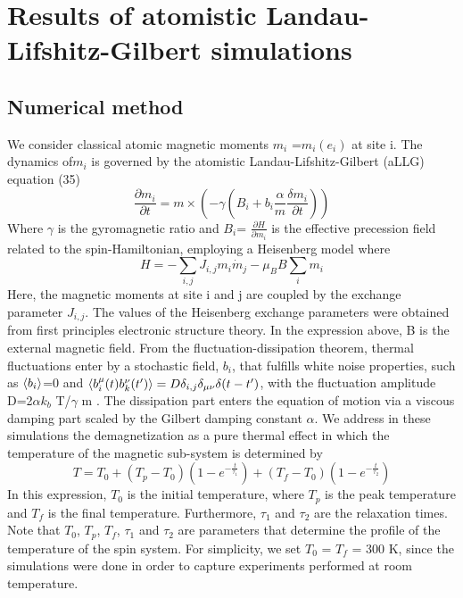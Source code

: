 \section{Results of atomistic Landau-Lifshitz-Gilbert simulations}

\subsection{Numerical method}
We consider classical atomic magnetic moments {$m_i$ }=$m_i(e_i)$ at site i. The dynamics of{$m_i$ }  is governed by the atomistic Landau-Lifshitz-Gilbert (aLLG) equation (35)
\begin{equation}
\frac{\partial m_i}{\partial t} = m \times (-\gamma(B_i+b_i\frac{\alpha}{m}\frac{\delta m_i}{\partial t}))
\end{equation}
Where $\gamma$ is the gyromagnetic ratio and $B_i$=  $\frac{\partial H}{\partial m_i}$ is the effective precession field related to the spin-Hamiltonian, employing a Heisenberg model where
\begin{equation}
H = - \sum_{i,j}J_{i,j}m_i \dot m_j - \mu_B B \sum_i m_i
\end{equation}
Here, the magnetic moments at site i and j are coupled by the exchange parameter $J_{i,j}$. The values of the Heisenberg exchange parameters were obtained from first principles electronic structure theory. In the expression above, B is the external magnetic field. From the fluctuation-dissipation theorem, thermal fluctuations enter by a stochastic field, $b_i$, that fulfills white noise properties, such as $\braket{b_i}$=0 and $\braket{b_i^\mu(t) b_k^\nu (t')}= D\delta_{i,j} \delta_{\mu \nu} \delta(t-t')$, with the fluctuation amplitude D=2$\alpha k_b$ T/$\gamma$ m . The dissipation part enters the equation of motion via a viscous damping part scaled by the Gilbert damping constant $\alpha$. We address in these simulations the demagnetization as a pure thermal effect in which the temperature of the magnetic sub-system is determined by
\begin{equation}
T = T_0 + (T_p - T_0)(1 - e^{-\frac{t}{\tau_1}})+(T_f - T_0)(1 - e^{-\frac{t}{\tau_2}})
\end{equation}
In this expression, $T_0$ is the initial temperature, where $T_p$ is the peak temperature and $T_f$ is the final temperature. Furthermore, $\tau_1$ and $\tau_2$ are the relaxation times. Note that $T_0$, $T_p$, $T_f$, $\tau_1$ and $\tau_2$ are parameters that determine the profile of the temperature of the spin system. For simplicity, we set $T_0$ = $T_f$ = 300 K, since the simulations were done in order to capture experiments performed at room temperature.

